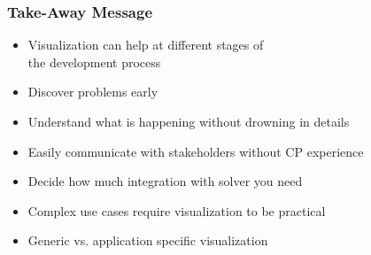 


\begin{frame}
\frametitle{Take-Away Message}
\begin{itemize}
\item Visualization can help at different stages of \\the development process
\item Discover problems early
\item Understand what is happening without drowning in details
\item Easily communicate with stakeholders without CP experience 
\item Decide how much integration with solver you need
\item Complex use cases require visualization to be practical
\item Generic vs. application specific visualization 
\end{itemize}
\end{frame}

